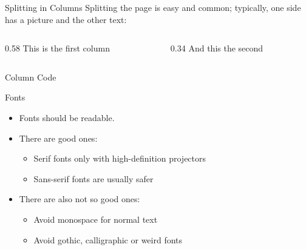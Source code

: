 \documentclass[aspectratio=169]{beamer}
\begin{document}
\begin{frame}[fragile]{Splitting in Columns}
  Splitting the page is easy and common; typically, one side has a picture and
  the other text:

  \begin{columns}[T,totalwidth=\textwidth]
    \begin{column}{0.58\textwidth}
      This is the first column
    \end{column}
    \begin{column}{0.34\textwidth}
      And this the second
    \end{column}
  \end{columns}

  \begin{ucascodebox}{Column Code}
  \end{ucascodebox}
\end{frame}

\begin{frame}{Fonts}
  \begin{itemize}
    \item Fonts should be readable.
    \item There are good ones:
      \begin{itemize}
        \item Serif fonts only with high-definition projectors
        \item Sans-serif fonts are usually safer
      \end{itemize}
    \item There are also not so good ones:
      \begin{itemize}
        \item Avoid monospace for normal text
        \item Avoid gothic, calligraphic or weird fonts
      \end{itemize}
  \end{itemize}
\end{frame}
\end{document}
